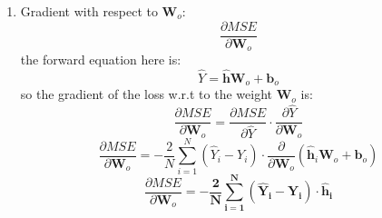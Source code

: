 \documentclass{article}
\begin{document}
\begin{enumerate}
    \item Gradient with respect to $\mathbf{W}_o$: $$\frac{\partial MSE}{\partial \mathbf{W}_o}$$
    the forward equation here is:
    \[
    \hat{Y} = \mathbf{\hat{h}} \mathbf{W}_o + \mathbf{b}_o
    \]
    so the gradient of the loss w.r.t to the weight $\mathbf{W}_o$ is:
    \[
    \frac{\partial MSE}{\partial \mathbf{W}_o} = \frac{\partial MSE}{\partial \hat{Y}} \cdot \frac{\partial \hat{Y}}{\partial \mathbf{W}_o}
    \]
    \[
    \frac{\partial MSE}{\partial \mathbf{W}_o} = -\frac{2}{N} \sum_{i=1}^{N} (\hat{Y}_i - Y_i) \cdot \frac{\partial}{\partial \mathbf{W}_o} (\mathbf{\hat{h}}_i \mathbf{W}_o + \mathbf{b}_o)
    \]
    \[
    \frac{\partial MSE}{\partial \mathbf{W}_o} = \mathbf{-\frac{2}{N} \sum_{i=1}^{N} (\hat{Y}_i - Y_i) \cdot \mathbf{\hat{h}}_i}
    \]
    

\end{enumerate}
\end{document}
